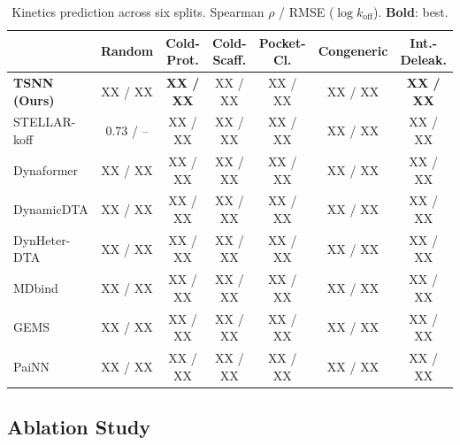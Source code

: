 \documentclass{article}
\begin{document}
\begin{table}[t]
\caption{Kinetics prediction across six splits.  Spearman $\rho$ /
  RMSE ($\log k_\text{off}$).  \textbf{Bold}: best.}
\label{tab:main}
\centering
\footnotesize
\begin{tabular}{@{}lcccccc@{}}
\toprule
& Random & Cold-Prot. & Cold-Scaff. & Pocket-Cl. & Congeneric & Int.-Deleak. \\
\midrule
\textbf{TSNN (Ours)}
  & XX / XX & \textbf{XX / XX} & XX / XX & XX / XX & XX / XX & \textbf{XX / XX} \\
STELLAR-koff
  & 0.73 / -- & XX / XX & XX / XX & XX / XX & XX / XX & XX / XX \\
Dynaformer
  & XX / XX & XX / XX & XX / XX & XX / XX & XX / XX & XX / XX \\
DynamicDTA
  & XX / XX & XX / XX & XX / XX & XX / XX & XX / XX & XX / XX \\
DynHeter-DTA
  & XX / XX & XX / XX & XX / XX & XX / XX & XX / XX & XX / XX \\
MDbind
  & XX / XX & XX / XX & XX / XX & XX / XX & XX / XX & XX / XX \\
GEMS
  & XX / XX & XX / XX & XX / XX & XX / XX & XX / XX & XX / XX \\
PaiNN
  & XX / XX & XX / XX & XX / XX & XX / XX & XX / XX & XX / XX \\
\bottomrule
\end{tabular}
\end{table}

\subsection{Ablation Study}
\end{document}
